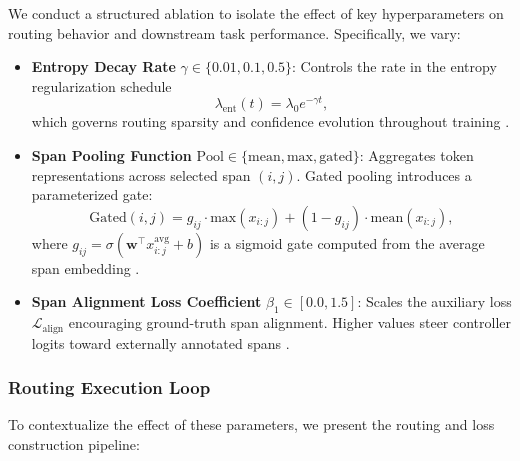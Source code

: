 We conduct a structured ablation to isolate the effect of key hyperparameters on routing behavior and downstream task performance. Specifically, we vary:

\begin{itemize}[leftmargin=1.5em]
  \item \textbf{Entropy Decay Rate} \(\gamma \in \{0.01, 0.1, 0.5\}\): Controls the rate in the entropy regularization schedule
  \begin{equation}
  \lambda_{\mathrm{ent}}(t) = \lambda_0 e^{-\gamma t},
  \label{eq:entropy_schedule}
  \end{equation}
  which governs routing sparsity and confidence evolution throughout training \cite{grandvalet2006entropy, pereyra2017regularizing}.

  \item \textbf{Span Pooling Function} \(\mathrm{Pool} \in \{\mathrm{mean}, \mathrm{max}, \mathrm{gated}\}\): Aggregates token representations across selected span \((i, j)\). Gated pooling introduces a parameterized gate:
  \begin{equation}
  \text{Gated}(i, j) = g_{ij} \cdot \mathrm{max}(x_{i:j}) + (1 - g_{ij}) \cdot \mathrm{mean}(x_{i:j}),
  \label{eq:gated_pooling}
  \end{equation}
  where \(g_{ij} = \sigma(\mathbf{w}^\top x_{i:j}^{\text{avg}} + b)\) is a sigmoid gate computed from the average span embedding \cite{kim2019unsupervised, zilliz2023pooling}.

  \item \textbf{Span Alignment Loss Coefficient} \(\beta_1 \in [0.0, 1.5]\): Scales the auxiliary loss \(\mathcal{L}_{\text{align}}\) encouraging ground-truth span alignment. Higher values steer controller logits toward externally annotated spans \cite{liu2024structured}.
\end{itemize}

\subsubsection*{Routing Execution Loop}

To contextualize the effect of these parameters, we present the routing and loss construction pipeline:

